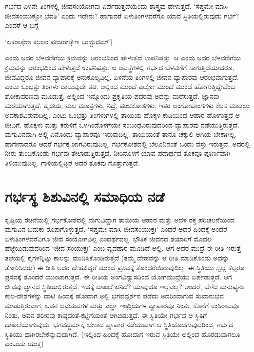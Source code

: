 ಗರ್ಭದ ಏಳನೇ ತಿಂಗಳಲ್ಲಿ ಜೀವಸಂಯೋಗವು ಏರ್ಪಡುತ್ತದೆಯೆಂದು ಶಾಸ್ತ್ರವು ಹೇಳುತ್ತದೆ. `ಸಪ್ತಮೇ ಮಾಸಿ ಜೀವಸಂಯುಕ್ತೋ ಭವತಿ' ಎಂದು ಇದೇನು? ಹಾಗಾದರೆ ಏಳುತಿಂಗಳವರೆಗೂ ಯಾವ ಸ್ಥಿತಿಯಲ್ಲಿರುವುದು ಗರ್ಭ? ಎಂದರೆ ಆ ಬಗ್ಗೆ-

\begin{shloka}
`ಏಕರಾತ್ರೇಣ ಕಲಲಂ ಪಂಚರಾತ್ರೇಣ ಬುದ್ಬುದಮ್'|
\end{shloka}
ಎಂದು ಅದರ ಬೆಳವಣಿಗೆಯ ಕ್ರಮವನ್ನು  ಆರಂಭದಿಂದ ಹೇಳುತ್ತದೆ ಉಪನಿಷತ್ತು. ಆ ಎಂದು ಅದರ ಬೆಳವಣಿಗೆಯ ಕ್ರಮವನ್ನು ಆರಂಭದಿಂದ ಹೇಳುತ್ತದೆ ಉಪನಿಷತ್ತು. ಆ ಅವಸ್ಥೆಗಳಲ್ಲಿ ಗರ್ಭದ ಬೆಳವಣಿಗೆ ಸಾಗುತ್ತಿದೆಯಾದರೂ, ಜೀವವಿದ್ದರೂ ಜೀವನ ವ್ಯಾಪಾರಕ್ಕೆ ಅನುಕೂಲ್ಯವಿಲ್ಲ. ಏಳನೆಯ ತಿಂಗಳಲ್ಲಿ ಜೀವನ ವ್ಯಾಪಾರವು ಆರಂಭವಾಗುತ್ತದೆ. ಎಂಟು ಒಂಭತ್ತು ತಿಂಗಳು ದಾಟುವುದೇ ತಡ, ಅಲ್ಲಿಂದ ಮುಂದೆ ಎಲ್ಲೋ ಮುಂದೆ ಮುಂದೆ ಹೋಗುತ್ತಿದ್ದೇವೆಂಬ ಶೋಕಾವರಣವು ಮೂಡುತ್ತೆ. ಅಲ್ಲಿಂದ ಇನ್ನೊಂದು ಪ್ರಕೃತಿಯ ಪದರವು ಅದನ್ನು ಮರೆಸುತ್ತದೆ. ಜ್ಞಾನವು ಮರೆಯಾಗುತ್ತದೆ. ಹೃದಯ, ಮಲ ಮೂತ್ರಗಳು, ನಿದ್ರೆ, ಪಂಚಕೋಶಗಳು, ಇತರ ಅಂಗೋಪಾಂಗಗಳು ಕೆಲಸ ಮಾಡಲು ಅವಕಾಶವಿರುವುದಿಲ್ಲ. ಎಂಟು ಒಂಭತ್ತು ತಿಂಗಳುಗಳಲ್ಲಿ ತಾಯಿಯ ಹೊಕ್ಕಳ ಕುಡಿಯಿಂದ ಆಹಾರ ಹೋಗುತ್ತದೆ ಆ ಜೀವಿಗೆ. ಹೊಕ್ಕಳು ಮತ್ತು ಕರುಳಿಗೆ ಒಳಗಿಂದೊಳಗೆಯೇ ಸಂಬಂಧವಿರುವುದರಿಂದ ವ್ಯಾಪಾರವು ನಡೆಯುತ್ತಿರುತ್ತದೆ. ಮಗುವಿನದಾಗಿ ಅಲ್ಲಿ ಏನೊಂದು ವ್ಯಾಪಾರವೂ ಇರುವುದಿಲ್ಲ. ತಾಯಿಯಂತೆ ತಾನೂ ಚಕ್ಕುಲಿ ಅಗಿಯ ಬೇಕಾಗಿಲ್ಲ. ಹಾಗೇನಾದರೂ ಆದರೆ ಗರ್ಭಕ್ಕೆ ಜಾಗವಿರುವುದಿಲ್ಲ. ಗರ್ಭಕೋಶದಲ್ಲಿ ಬೆಲೂನಿನಂತೆ ಒಂದು ವಸ್ತು ಇರುತ್ತದೆ. ಅದರಲ್ಲಿ ನೀರು ತುಂಬಿಕೊಂಡು ಗರ್ಭವು ತೇಲಾಡುತ್ತಿರುತ್ತದೆ. ನೀರಿನೊಳಗೆ ಯಾವ ಪದಾರ್ಥದ ತೂಕವೂ ಪೂರ್ಣವಾಗಿ ತಿಳಿಯುವುದಿಲ್ಲ. ಗಾಳಿಯಲ್ಲಿಟ್ಟರೆ ಅದರ ತೂಕವು ಗೊತ್ತಾಗುತ್ತದೆ.

\section*{ಗರ್ಭಸ್ಥ ಶಿಶುವಿನಲ್ಲಿ ಸಮಾಧಿಯ ನಡೆ}

ಸೃಷ್ಟಿಯ ರಚನೆಯಲ್ಲಿ ಗರ್ಭಕೋಶದಲ್ಲಿ ಮಗುವಿದ್ದಾಗ ತಾಯಿಯ ಆಹಾರ ಮತ್ತು ಅವಳ ರಕ್ತ ಪರಿಚಲನೆಯಿಂದ ಮಗುವಿನ ಬದುಕು ರೂಪುಗೊಳ್ಳುತ್ತದೆ. `ಸಪ್ತಮೇ ಮಾಸಿ ಜೀವಸಂಯುಕ್ತಃ' ಎಂದರೆ ಅದರ ಹಿಂದಕ್ಕೆ ಅಂದರೆ ಏಳುತಿಂಗಳವರೆವಿಗೂ ಜೀವ ಸಂಯೋಗವಿಲ್ಲ ಎಂದರ್ಥವಲ್ಲ. ಭೌತಿಕ ಜೀವನದ ತಯಾರಿಗೆ ಮೊದಲ ಹೆಜ್ಜೆಯಿಡುವುದರಿಂದ `ಜೀವ ಸಂಯುಕ್ತಃ' ಎಂಬ ವ್ಯವಹಾರ ಮೂಡಿದೆ ಅಲ್ಲಿ. ಆಗ ಅದರ ಮುದ್ರೆ ಈ ರೀತಿ ಇರುತ್ತೆ- ತಲೆಯಲ್ಲಿ ಕೈಗಳನ್ನಿಟ್ಟು ಕಾಲನ್ನು ಮುಡಿಸಿಕೊಂಡಿರುತ್ತದೆ (ತಮ್ಮ ದೇಹವನ್ನು ಆ ರೀತಿ ಮಾಡಿಕೊಂಡು ಅದನ್ನು ತೋರಿಸಿದರು) ಈ ರೀತಿ ಅದರ ದೇಹವಿದ್ದರೆ ಮುಂದೆ ಪ್ರಸವಕ್ಕೆ ತೊಂದರೆಯಿರುವುದಿಲ್ಲ. ಈ ಸ್ಥಿತಿಯು ಸ್ವಲ್ಪ ಕೆಟ್ಟರೂ ಪ್ರಸವಕ್ಕೆ ತೊಂದರೆ ಯುಂಟಾಗುತ್ತದೆ. ಈ ರೀತಿಯ ಅಂಗವಿನ್ಯಾಸದಿಂದ ಯೋಗಮುದ್ರೆಯು ಏರ್ಪಡುತ್ತದೆ. ಆಗ ಜೀವವು ಜ್ಞಾನದ ಸ್ಥಿತಿಯಲ್ಲಿರುತ್ತದೆ. ಇದಕ್ಕೆ ದಾಖಲೆ ಏನಿದೆ? ಯಾವುದೂ ಇಲ್ಲವಲ್ಲ? ಅಂದರೆ, ಬೆಳೆದ ಮನುಷ್ಯನು ಕಾಲ-ದೇಶಗಳನ್ನು ದಾಟಿ ಹಿಂದಕ್ಕೆ ಹೋದಾಗ ಅಲ್ಲಿ ಭಗವದ್ದರ್ಶನ ಪಡೆದು ಅದರಿಂದಾಗುವ ಸುಖಾನುಭವ ಮಾಡುತ್ತಿರುವಾಗ, ಅವನ ಅವಯವಗಳ ಮತ್ತು ಎಲ್ಲಾ ಇಂದ್ರಿಯಗಳ ವ್ಯಾಪಾರವೂ ನಿಂತು, ಕೊನೆಗೆ ಉಸಿರಾಟವೂ ನಿಂತು, ಅವನ ಶರೀರವು ಕಾಷ್ಠದಂತೆ-ಕಟ್ಟಿಗೆಯಂತೆ ಆಗಿಬಿಡುತ್ತದೆ. ಈ ಸ್ಥಿತಿಯೇ ಗರ್ಭದ ಆ ಸ್ಥಿತಿಗೆ ದಾಖಲೆಯಾಗುವುದು. ಭಗವದ್ಧರ್ಮಕ್ಕೆ ಬೇಕಾದ ವ್ಯಾಪಾರ ನಡೆಯುವಾಗ ಆ ಸ್ಥಿತಿಯೊದಗುವುದರಿಂದ, ಗರ್ಭದ ಸ್ಥಿತಿಯು ಹಾಗಿರಬೇಕೆನ್ನುವುದಾಗಿದೆ. (ಇಲ್ಲಿಂದ ಹಿಂದಕ್ಕೆ ಹೋದಾಗ ಇರುವ ಸ್ಥಿತಿಯೇ ಅಲ್ಲಿಂದ ಹೊರಡುವಾಗಲೂ ಎಂಬುದು ಯುಕ್ತ)

